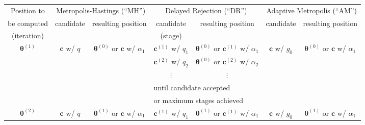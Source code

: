 \begin{sidewaystable}[h]
\begin{tabular}{|c||c|c||c|c||c|c|}
\hline
 Position to         & \multicolumn{2}{c||}{Metropolis-Hastings (``MH'')}                & \multicolumn{2}{c||}{Delayed Rejection (``DR'')}                         & \multicolumn{2}{c|}{Adaptive Metropolis (``AM'')}          \\
\cline{2-7}
 be computed         & candidate               & resulting position                      & candidate              & resulting position                              & candidate        & resulting position                      \\
(iteration)          &                         &                                         & (stage)                &                                                 &                  &                                         \\
\hline
\hline
$\boldsymbol{\theta}^{(1)}$       & $\mathbf{c}$ w/ $q$              & $\boldsymbol{\theta}^{(0)}$ or $\mathbf{c}$ w/ $\alpha_1$       & $\mathbf{c}^{(1)}$ w/ $q_1$     & $\boldsymbol{\theta}^{(0)}$ or $\mathbf{c}^{(1)}$ w/ $\alpha_1$       & $\mathbf{c}$ w/ $g_0$     & $\boldsymbol{\theta}^{(0)}$ or $\mathbf{c}$ w/ $\alpha_1$       \\
\cline{4-5}
                     &                         &                                         & $\mathbf{c}^{(2)}$ w/ $q_2$     & $\boldsymbol{\theta}^{(0)}$ or $\mathbf{c}^{(2)}$ w/ $\alpha_2$       &                  &                                         \\
\cline{4-5}
                     &                         &                                         & $\vdots$               & $\vdots$                                        &                  &                                         \\
\cline{4-5}
                     &                         &                                         & \multicolumn{2}{l||}{until candidate accepted}                           &                  &                                         \\
                     &                         &                                         & \multicolumn{2}{l||}{or maximum stages achieved}                         &                  &                                         \\
\hline 
\hline
$\boldsymbol{\theta}^{(2)}$       & $\mathbf{c}$ w/ $q$              & $\boldsymbol{\theta}^{(1)}$ or $\mathbf{c}$ w/ $\alpha_1$       & $\mathbf{c}^{(1)}$ w/ $q_1$     & $\boldsymbol{\theta}^{(1)}$ or $\mathbf{c}^{(1)}$ w/ $\alpha_1$       & $\mathbf{c}$ w/ $g_0$     & $\boldsymbol{\theta}^{(1)}$ or $\mathbf{c}$ w/ $\alpha_1$       \\

\end{tabular}
\end{sidewaystable}
